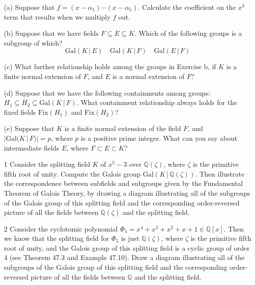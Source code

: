 \begin{problem}[Warmup]{(a)}
    Suppose that $f = (x - \alpha_1)\cdots(x - \alpha_5)$. Calculate the coefficient on the $x^3$ term that results when we multiply $f$ out.
\end{problem}
\unsolved

\begin{problem}[Warmup]{(b)}
    Suppose that we have fields $F \subseteq E \subseteq K$. Which of the following groups is a subgroup of which? \[\mathrm{Gal}(K \,|\, E) \quad \mathrm{Gal}(K \,|\, F) \quad \mathrm{Gal}(E \,|\, F)\]
\end{problem}
\unsolved

\begin{problem}[Warmup]{(c)}
    What further relationship holds among the groups in Exercise b, if $K$ is a finite normal extension of $F$, and $E$ is a normal extension of $F$?
\end{problem}
\unsolved

\begin{problem}[Warmup]{(d)}
    Suppose that we have the following containments among groups: $H_1 \subseteq H_2 \subseteq \mathrm{Gal}(K \,|\, F)$. What containment relationship always holds for the fixed fields $\mathrm{Fix}(H_1)$ and $\mathrm{Fix}(H_2)$?
\end{problem}
\unsolved

\begin{problem}[Warmup]{(e)}
    Suppose that $K$ is a finite normal extension of the field $F$, and $|\mathrm{Gal}(K \,|\, F)| = p$, where $p$ is a positive prime integer. What can you say about intermediate fields $E$, where $F \subset E \subset K$?
\end{problem}
\unsolved

\begin{problem}{1}
    Consider the splitting field $K$ of $x^5 - 3$ over $\mathbb{Q}(\zeta)$, where $\zeta$ is
    the primitive fifth root of unity. Compute the Galois group
    $\mathrm{Gal}(K \,|\, \mathbb{Q}(\zeta))$. Then illustrate the correspondence between
    subfields and subgroups given by the Fundamental Theorem of Galois Theory, by drawing a
    diagram illustrating all of the subgroups of the Galois group of this splitting field
    and the corresponding order-reversed picture of all the fields between
    $\mathbb{Q}(\zeta)$ and the splitting field.
\end{problem}
\unsolved

\begin{problem}{2}
    Consider the cyclotomic polynomial
    $\Phi_5 = x^4 + x^3 + x^2 + x + 1 \in \mathbb{Q}[x]$. Then we know that the splitting
    field for $\Phi_5$ is just $\mathbb{Q}(\zeta)$, where $\zeta$ is the primitive fifth
    root of unity, and the Galois group of this splitting field is a cyclic group of order
    4 (see Theorem 47.3 and Example 47.10). Draw a diagram illustrating all of the
    subgroups of the Galois group of this splitting field and the corresponding
    order-reversed picture of all the fields between $\mathbb{Q}$ and the splitting field.
\end{problem}
\unsolved

